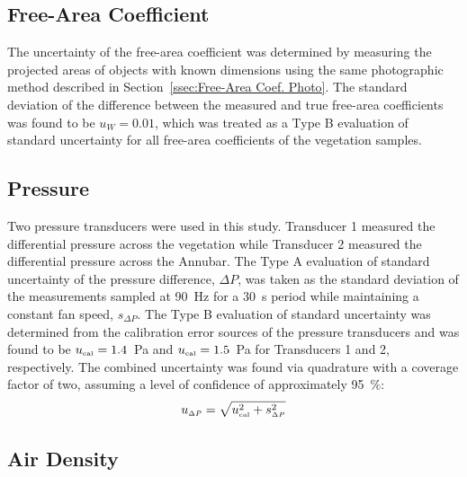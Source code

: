 \documentclass[12pt]{article}
\begin{document}
\subsection{ Free-Area Coefficient }
\label{ssec:FAACUncertainty}

The uncertainty of the free-area coefficient was determined by measuring the projected areas of objects with known dimensions using the same photographic method described in Section~\ref{ssec:Free-Area Coef. Photo}. The standard deviation of the difference between the measured and true free-area coefficients was found to be $u_{\scriptscriptstyle W}=0.01$, which was treated as a Type B evaluation of standard uncertainty for all free-area coefficients of the vegetation samples.


\subsection{Pressure}
\label{ssec:PressUncertainty}

Two pressure transducers were used in this study. Transducer 1 measured the differential pressure across the vegetation while Transducer 2 measured the differential pressure across the Annubar. The Type A evaluation of standard uncertainty of the pressure difference, $\Delta P$, was taken as the standard deviation of the measurements sampled at 90~\si{Hz} for a 30~\si{s} period while maintaining a constant fan speed, $s_{\scriptscriptstyle \Delta P}$. The Type B evaluation of standard uncertainty was determined from the calibration error sources of the pressure transducers and was found to be $u_{\rm \scriptscriptstyle cal}=1.4$~Pa and $u_{\rm \scriptscriptstyle cal}=1.5$~Pa for Transducers 1 and 2, respectively. The combined uncertainty was found via quadrature with a coverage factor of two, assuming a level of confidence of approximately 95~\%:
\begin{equation}
\label{eq:pressureuncertainty}
u_{\scriptscriptstyle \Delta P} = \sqrt{ u_{\rm \scriptscriptstyle cal}^2 + s_{\scriptscriptstyle \Delta P}^2}
\end{equation}

\subsection{Air Density}
\label{ssec:ADUncertainty}
\end{document}
